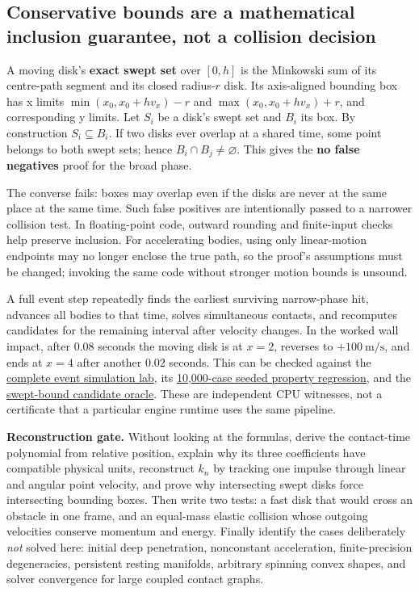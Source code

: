 \subsection{Conservative bounds are a mathematical inclusion guarantee, not a collision decision}\label{01-foundations-i-ch018-conservative-bounds-are-a-mathematical-inclusion-guarantee-not-a-collision-decision}

A moving disk's \textbf{exact swept set} over \([0,h]\) is the Minkowski sum of its centre-path segment and its closed radius-\(r\) disk. Its axis-aligned bounding box has x limits \(\min(x_0,x_0+hv_x)-r\) and \(\max(x_0,x_0+hv_x)+r\), and corresponding y limits. Let \(S_i\) be a disk's swept set and \(B_i\) its box. By construction \(S_i\subseteq B_i\). If two disks ever overlap at a shared time, some point belongs to both swept sets; hence \(B_i\cap B_j\neq\varnothing\). This gives the \textbf{no false negatives} proof for the broad phase.

The converse fails: boxes may overlap even if the disks are never at the same place at the same time. Such false positives are intentionally passed to a narrower collision test. In floating-point code, outward rounding and finite-input checks help preserve inclusion. For accelerating bodies, using only linear-motion endpoints may no longer enclose the true path, so the proof's assumptions must be changed; invoking the same code without stronger motion bounds is unsound.

A full event step repeatedly finds the earliest surviving narrow-phase hit, advances all bodies to that time, solves simultaneous contacts, and recomputes candidates for the remaining interval after velocity changes. In the worked wall impact, after \(0.08\) seconds the moving disk is at \(x=2\), reverses to \(+100\ \mathrm{m/s}\), and ends at \(x=4\) after another \(0.02\) seconds. This can be checked against the \href{../../tools/labs/disk_event_pipeline_lab.cpp}{complete event simulation lab}, its \href{../../tools/labs/disk_event_property_lab.cpp}{10,000-case seeded property regression}, and the \href{../../tools/labs/swept_broadphase_lab.cpp}{swept-bound candidate oracle}. These are independent CPU witnesses, not a certificate that a particular engine runtime uses the same pipeline.

\textbf{Reconstruction gate.} Without looking at the formulas, derive the contact-time polynomial from relative position, explain why its three coefficients have compatible physical units, reconstruct \(k_n\) by tracking one impulse through linear and angular point velocity, and prove why intersecting swept disks force intersecting bounding boxes. Then write two tests: a fast disk that would cross an obstacle in one frame, and an equal-mass elastic collision whose outgoing velocities conserve momentum and energy. Finally identify the cases deliberately \emph{not} solved here: initial deep penetration, nonconstant acceleration, finite-precision degeneracies, persistent resting manifolds, arbitrary spinning convex shapes, and solver convergence for large coupled contact graphs.

